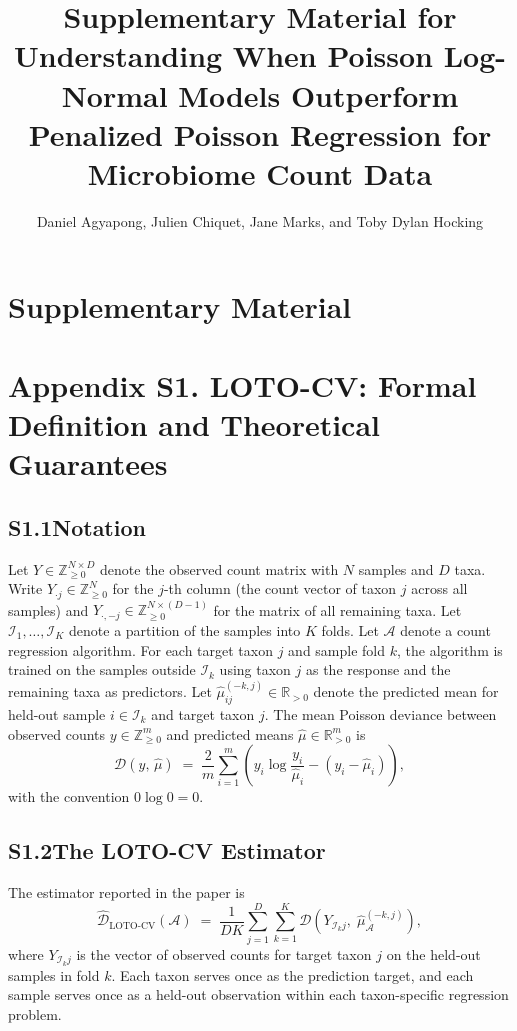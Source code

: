 \documentclass[11pt]{article}
\title{Supplementary Material for\\
Understanding When Poisson Log-Normal Models Outperform Penalized Poisson Regression for Microbiome Count Data}
\author{Daniel Agyapong, Julien Chiquet, Jane Marks, and Toby Dylan Hocking}
\date{}
\begin{document}
\maketitle

\section*{Supplementary Material}

\section*{Appendix S1. LOTO-CV: Formal Definition and Theoretical Guarantees}

\subsection*{S1.1\quad Notation}

Let $Y \in \mathbb{Z}_{\geq 0}^{N \times D}$ denote the observed count matrix with $N$ samples and $D$ taxa.
Write $Y_{\cdot j} \in \mathbb{Z}_{\geq 0}^{N}$ for the $j$-th column (the count vector of taxon $j$ across all samples) and $Y_{\cdot,-j} \in \mathbb{Z}_{\geq 0}^{N \times (D-1)}$ for the matrix of all remaining taxa.
Let $\mathcal{I}_1,\ldots,\mathcal{I}_K$ denote a partition of the samples into $K$ folds.
Let $\mathcal{A}$ denote a count regression algorithm.
For each target taxon $j$ and sample fold $k$, the algorithm is trained on the samples outside $\mathcal{I}_k$ using taxon $j$ as the response and the remaining taxa as predictors.
Let $\hat{\mu}^{(-k,j)}_{ij} \in \mathbb{R}_{>0}$ denote the predicted mean for held-out sample $i \in \mathcal{I}_k$ and target taxon $j$.
The mean Poisson deviance between observed counts $y \in \mathbb{Z}_{\geq 0}^{m}$ and predicted means $\hat{\mu} \in \mathbb{R}_{>0}^{m}$ is
\[
  \mathcal{D}(y,\, \hat{\mu})
  \;=\;
  \frac{2}{m} \sum_{i=1}^{m} \left( y_i \log \frac{y_i}{\hat{\mu}_i} - (y_i - \hat{\mu}_i) \right),
\]
with the convention $0 \log 0 = 0$.

\subsection*{S1.2\quad The LOTO-CV Estimator}

The estimator reported in the paper is
\[
  \widehat{\mathcal{D}}_{\mathrm{LOTO}\text{-}\mathrm{CV}}(\mathcal{A})
  \;=\;
  \frac{1}{DK} \sum_{j=1}^{D}\sum_{k=1}^{K}
  \mathcal{D}\!\left(Y_{\mathcal{I}_k j},\; \hat{\mu}^{(-k,j)}_{\mathcal{A}}\right),
\]
where $Y_{\mathcal{I}_k j}$ is the vector of observed counts for target taxon $j$ on the held-out samples in fold $k$.
Each taxon serves once as the prediction target, and each sample serves once as a held-out observation within each taxon-specific regression problem.
\end{document}
